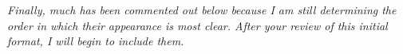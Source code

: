 \documentclass[manuscript,screen,review, 12pt]{acmart}
\begin{document}
\it{Finally, much has been commented out below because I am still determining
    the order in which their appearance is most clear. After your review of this
    initial format, I will begin to include them.}













\end{document}
